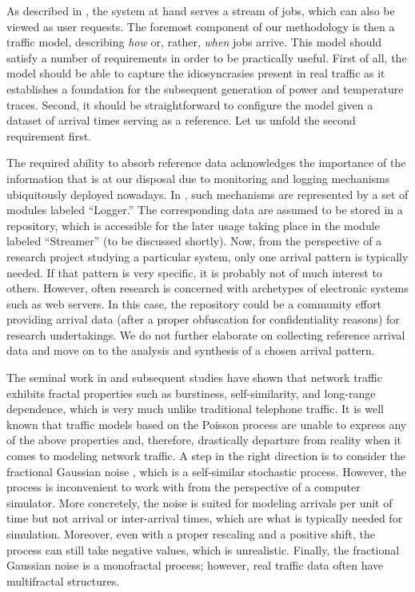 As described in , the system at hand serves a stream
of jobs, which can also be viewed as user requests. The foremost component of
our methodology is then a traffic model, describing \emph{how} or, rather,
\emph{when} jobs arrive. This model should satisfy a number of requirements in
order to be practically useful. First of all, the model should be able to
capture the idiosyncrasies present in real traffic as it establishes a
foundation for the subsequent generation of power and temperature traces.
Second, it should be straightforward to configure the model given a dataset of
arrival times serving as a reference. Let us unfold the second requirement
first.

The required ability to absorb reference data acknowledges the importance of the
information that is at our disposal due to monitoring and logging mechanisms
ubiquitously deployed nowadays. In , such mechanisms are
represented by a set of modules labeled ``Logger.'' The corresponding data are
assumed to be stored in a repository, which is accessible for the later usage
taking place in the module labeled ``Streamer'' (to be discussed shortly). Now,
from the perspective of a research project studying a particular system, only
one arrival pattern is typically needed. If that pattern is very specific, it is
probably not of much interest to others. However, often research is concerned
with archetypes of electronic systems such as web servers. In this case, the
repository could be a community effort providing arrival data (after a proper
obfuscation for confidentiality reasons) for research undertakings. We do not
further elaborate on collecting reference arrival data and move on to the
analysis and synthesis of a chosen arrival pattern.

The seminal work in \cite{leland1994} and subsequent studies have shown that
network traffic exhibits fractal properties such as burstiness, self-similarity,
and long-range dependence, which is very much unlike traditional telephone
traffic. It is well known that traffic models based on the Poisson process
\cite{lifshits2014} are unable to express any of the above properties and,
therefore, drastically departure from reality when it comes to modeling network
traffic. A step in the right direction is to consider the fractional Gaussian
noise \cite{lifshits2014}, which is a self-similar stochastic process. However,
the process is inconvenient to work with from the perspective of a computer
simulator. More concretely, the noise is suited for modeling arrivals per unit
of time but not arrival or inter-arrival times, which are what is typically
needed for simulation. Moreover, even with a proper rescaling and a positive
shift, the process can still take negative values, which is unrealistic.
Finally, the fractional Gaussian noise is a monofractal process; however, real
traffic data often have multifractal structures.

